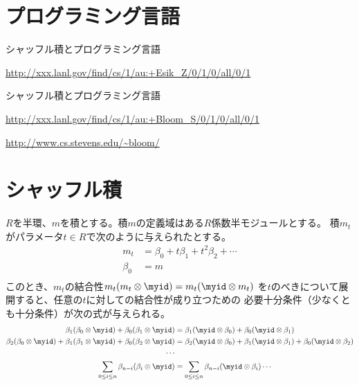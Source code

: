 \section{プログラミング言語}\label{s1:プログラミング言語} %
	\begin{description}\setlength{\itemsep}{-1mm} %
		\item[Zoltan Esik]シャッフル積とプログラミング言語
		\begin{description}\setlength{\itemsep}{-1mm} %
			\item[arXiv]\url{http://xxx.lanl.gov/find/cs/1/au:+Esik_Z/0/1/0/all/0/1}
		\end{description} %
		\item[Stephen L. Bloom]シャッフル積とプログラミング言語
		\begin{description}\setlength{\itemsep}{-1mm} %
			\item[arXiv]\url{http://xxx.lanl.gov/find/cs/1/au:+Bloom_S/0/1/0/all/0/1}
			\item[ホームページ]\url{http://www.cs.stevens.edu/~bloom/}
		\end{description} %
	\end{description} %

\section{シャッフル積}\label{s1:シャッフル積} %
	$R$を半環、$m$を積とする。積$m$の定義域はある$R$係数半モジュールとする。
	積$m_t$がパラメータ$t\in R$で次のように与えられたとする。
	\begin{equation*}\begin{split} %
		m_t &= \beta_0 + t\beta_1 + t^2\beta_2 + \cdots \\
		\beta_0 &= m \\
	\end{split}\end{equation*} %
	このとき、$m_t$の結合性$m_t(m_t\otimes \myid)=m_t(\myid\otimes m_t)$
	を$t$のべきについて展開すると、任意の$t$に対しての結合性が成り立つための
	必要十分条件（少なくとも十分条件）が次の式が与えられる。
	\begin{equation*}\begin{split} %
		\beta_1(\beta_0\otimes \myid) + \beta_0(\beta_1\otimes \myid)
		&= \beta_1(\myid\otimes \beta_0) + \beta_0(\myid\otimes \beta_1)
		\\
		\beta_2(\beta_0\otimes \myid) + \beta_1(\beta_1\otimes \myid)
		+ \beta_0(\beta_2\otimes \myid)
		&= \beta_2(\myid\otimes \beta_0) + \beta_1(\myid\otimes \beta_1)
		+ \beta_0(\myid\otimes \beta_2)
		\\
		\cdots \\
		\sum_{0\le i\le n}\beta_{n-i}(\beta_i\otimes \myid)
		&= \sum_{0\le i\le n}\beta_{n-i}(\myid\otimes \beta_i)
		\cdots \\
	\end{split}\end{equation*} %

